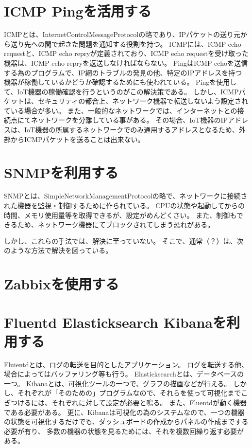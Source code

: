 \section{ICMP Pingを活用する}
ICMPとは、InternetControlMessageProtocolの略であり、IPパケットの送り元から送り先への間で起きた問題を通知する役割を持つ。
ICMPには、ICMP echo requestと、ICMP echo repryが定義されており、ICMP echo requestを受け取った機器は、ICMP echo repryを返送しなければならない。
PingはICMP echoを送信する為のプログラムで、IP網のトラブルの発見の他、特定のIPアドレスを持つ機器が稼働しているかどうか確認するためにも使われている。
Pingを使用して、IoT機器の稼働確認を行うというのがこの解決策である。
しかし、ICMPパケットは、セキュリティの都合上、ネットワーク機器で転送しないよう設定されている場合が多い。
また、一般的なネットワークでは、インターネットとの接続点にてネットワークを分離している事がある。
その場合、IoT機器のIPアドレスは、IoT機器の所属するネットワークでのみ通用するアドレスとなるため、外部からICMPパケットを送ることは出来ない。

\begin{comment}
NAPTとは、NetworkAddressPortTranslationの略で、外部のネットワークと内部のネットワークを分離する機能を持つ。
そのため、機器管理者から送信された
具体的には、内側から外側へデータを送信する際、送信元IPアドレスとポート番号を機器のIPアドレスとポート番号に変換・記憶し、
外部から内部へデータの送信があった場合、記憶していたIPアドレスとポート番号から、送信先IPアドレスとポートを書き換え、内部へ転送する
そのため、内側から始る通信は問題ないが、外側から始まる通信はブロックしてしまう。
\end{comment}

\section{SNMPを利用する}
SNMPとは、SimpleNetworkManagementProtocolの略で、ネットワークに接続された機器を監視・制御するために作られている。
CPUの状態や起動してからの時間、メモリ使用量等を取得できるが、設定がめんどくさい。
また、制御もできるため、ネットワーク機器にてブロックされてしまう恐れがある。


しかし、これらの手法では、解決に至っていない。
そこで、通常（？）は、次のような方法で解決を図っている。
\section{Zabbixを使用する}

\section{Fluentd Elasticksearch Kibanaを利用する}
Fluientdとは、ログの転送を目的としたアプリケーション。
ログを転送する他、場合によってはバッファリング等も行う。
Elasticksearchとは、データベースの一つ。
Kibanaとは、可視化ツールの一つで、グラフの描画などが行える。
しかし、それぞれが「そのための」プログラムなので、それらを使って可視化までこぎつけるには、それぞれに対して設定が必要と鳴る。
また、Fluentdが動く機器である必要がある。
更に、Kibanaは可視化の為のシステムなので、一つの機器の状態を可視化するだけでも、ダッシュボードの作成からパネルの作成までする必要が有り、
多数の機器の状態を見るためには、それを複数回繰り返す必要がある。

